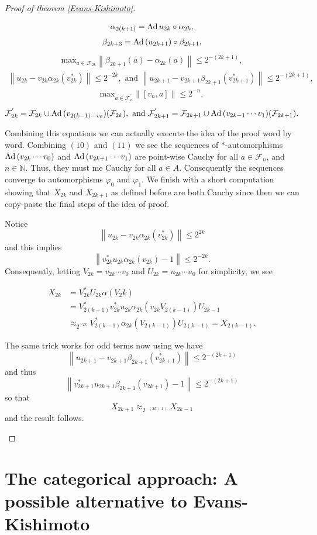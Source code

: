 \documentclass[11pt,a4paper,oneside]{amsart}
\newcommand{\Ad}{{\rm Ad\,}}
\newcommand{\norm}[1]{\left\|#1\right\|} %
\begin{document}
\begin{proof}[Proof of theorem \ref{Evans-Kishimoto}]
\begin{enumerate}
\begin{align}
\alpha_{2(k+1)}=\Ad u_ {2k}\circ \alpha_{2k},
\end{align}  
\begin{align}
\beta_{2k+3}=\Ad (u_{2k+1})\circ \beta_{2k+1},
\end{align}
\begin{align}
\mathrm{max}_{a\in \mathcal F_{2k}}\norm{\beta_{2k+1}(a)-\alpha_{2k}(a)}\leq 2^{-(2k+1)},
\end{align}
\begin{align}
\norm{u_{2k}-v_{2k}\alpha_{2k}(v_{2k}^*)}\leq 2^{-2k}, \text{ and } \norm{u_{2k+1}- v_{2k+1}\beta_{2k+1}(v_{2k+1}^*)}\leq 2 ^{-(2k+1)},
\end{align}
\begin{align}
\mathrm{max}_{a\in \mathcal F_n^{'}}\norm{[v_n,a]}\leq 2^{-n},
\end{align}
\begin{align}
\mathcal F_{2k}^{'}=\mathcal F_{2k}\cup \Ad(v_{2(k-1)\cdots v_0})(\mathcal F_{2k}), \text{ and } \mathcal F_{2k+1}^{'}= \mathcal F_{2k+1}\cup \Ad(v_{2k-1}\cdots v_1)(\mathcal F_{2k+1}). 
\end{align}

Combining this equations we can actually execute the idea of the proof word by word. Combining $(10)$ and $(11)$ we see the sequences of $*$-automorphisms $\Ad (v_{2k}\cdots v_0)$ and $\Ad (v_{2k+1}\cdots v_1)$ are point-wise Cauchy for all $a\in \mathcal F_n$, and $n\in \mathbb{N}$. Thus, they must me Cauchy for all $a\in A$. Consequently the sequences converge to automorphisms $\varphi_0$ and $\varphi_1$. We finish with a short computation showing that $X_{2k}$ and $X_{2k+1}$ as defined before are both Cauchy since then we can copy-paste the final steps of the idea of proof.      

Notice$$\norm{u_{2k}-v_{2k}\alpha_{2k}(v_{2k}^*)}\leq 2^{2k}$$and this implies$$\norm{v^*_{2k}u_{2k}\alpha_{2k}(v_{2k})-1}\leq 2^{-2k}.$$ Consequently, letting $V_{2k}=v_{2k}\cdots v_0$ and $U_{2k}= u_{2k}\cdots u_0$ for simplicity, we see


\begin{align*}
X_{2k}& =V^*_{2k}U_{2k}\alpha(V_2k)\\ &= V^*_{2(k-1)}v^*_{2k}u_{2k}\alpha_{2k}(v_{2k}V_{2(k-1)})U_{2k-1}\\& \approx_{2^{-2k}} V^*_{2(k-1)}\alpha_{2k}(V_{2(k-1)})U_{2(k-1)}=X_{2(k-1)}.
\end{align*}

The same trick works for odd terms now using we have$$\norm{u_{2k+1}-v_{2k+1}\beta_{2k+1}(v_{2k+1}^*)}\leq 2^{-(2k+1)}$$and thus$$\norm{v_{2k+1}^*u_{2k+1}\beta_{2k+1}(v_{2k+1})-1}\leq 2^{-(2k+1)}$$ so that $$X_{2k+1}\approx_{2^{-(2k+1)}} X_{2k-1}$$ and the result follows. 
\end{enumerate}

\end{proof}

\section{The categorical approach: A possible alternative to Evans-Kishimoto}
\end{document}
